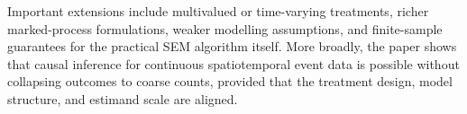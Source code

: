 \documentclass{statsoc}
\newcommand{\1}{\mathbbm{1}}
\begin{document}



Important extensions include multivalued or time-varying treatments, richer marked-process formulations, weaker modelling assumptions, and finite-sample guarantees for the practical SEM algorithm itself. More broadly, the paper shows that causal inference for continuous spatiotemporal event data is possible without collapsing outcomes to coarse counts, provided that the treatment design, model structure, and estimand scale are aligned.
\end{document}
